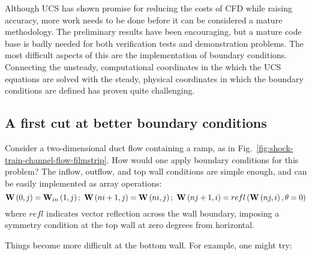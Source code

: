 Although UCS has shown promise for reducing the costs of CFD while raising accuracy, more work needs to be done before it can be considered a mature methodology. The preliminary results have been encouraging, but a mature code base is badly needed for both verification tests and demonstration problems. The most difficult aspects of this are the implementation of boundary conditions. Connecting the unsteady, computational coordinates in the which the UCS equations are solved with the steady, physical coordinates in which the boundary conditions are defined has proven quite challenging. 
\subsection{A first cut at better boundary conditions}
Consider a two-dimensional duct flow containing a ramp, as in Fig.~\ref{fig:shock-train-channel-flow-filmstrip}. How would one apply boundary conditions for this problem? The inflow, outflow, and top wall conditions are simple enough, and can be easily implemented as array operations: 
\[{\bf{W}}\left( {0,j} \right) = {{\bf{W}}_{in}}\left( {1,j} \right);\,\,{\bf{W}}\left( {ni + 1,j} \right) = {\bf{W}}\left( {ni,j} \right);\,\,{\bf{W}}\left( {nj + 1,i} \right) = refl\left( {{\bf{W}}\left( {nj,i} \right),\theta  = 0} \right)\]
where $refl$ indicates vector reflection across the wall boundary, imposing a symmetry condition at the top wall at zero degrees from horizontal.

Things become more difficult at the bottom wall. For example, one might try:

